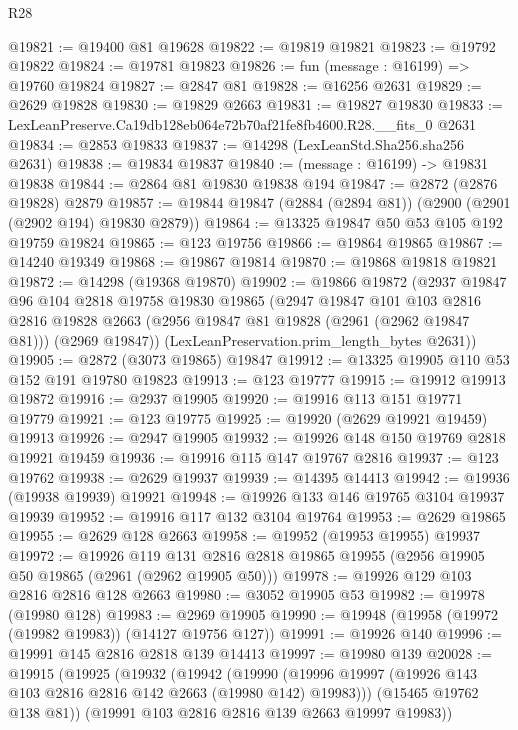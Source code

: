 \begin{lexlean}{R28}
\begin{coremodule}
@19821 := @19400 @81 @19628
@19822 := @19819 @19821
@19823 := @19792 @19822
@19824 := @19781 @19823
@19826 := fun (message : @16199) => @19760 @19824
@19827 := @2847 @81
@19828 := @16256 @2631
@19829 := @2629 @19828
@19830 := @19829 @2663
@19831 := @19827 @19830
@19833 := LexLeanPreserve.Ca19db128eb064e72b70af21fe8fb4600.R28.__fits_0 @2631
@19834 := @2853 @19833
@19837 := @14298 (LexLeanStd.Sha256.sha256 @2631)
@19838 := @19834 @19837
@19840 := (message : @16199) -> @19831 @19838
@19844 := @2864 @81 @19830 @19838 @194
@19847 := @2872 (@2876 @19828) @2879
@19857 := @19844 @19847 (@2884 (@2894 @81)) (@2900 (@2901 (@2902 @194) @19830 @2879))
@19864 := @13325 @19847 @50 @53 @105 @192 @19759 @19824
@19865 := @123 @19756
@19866 := @19864 @19865
@19867 := @14240 @19349
@19868 := @19867 @19814
@19870 := @19868 @19818 @19821
@19872 := @14298 (@19368 @19870)
@19902 := @19866
    @19872
    (@2937
      @19847
      @96
      @104
      @2818
      @19758
      @19830
      @19865
      (@2947
        @19847
        @101
        @103
        @2816
        @2816
        @19828
        @2663
        (@2956 @19847 @81 @19828 (@2961 (@2962 @19847 @81)))
        (@2969 @19847))
      (LexLeanPreservation.prim_length_bytes @2631))
@19905 := @2872 (@3073 @19865) @19847
@19912 := @13325 @19905 @110 @53 @152 @191 @19780 @19823
@19913 := @123 @19777
@19915 := @19912 @19913 @19872
@19916 := @2937 @19905
@19920 := @19916 @113 @151 @19771 @19779
@19921 := @123 @19775
@19925 := @19920 (@2629 @19921 @19459) @19913
@19926 := @2947 @19905
@19932 := @19926 @148 @150 @19769 @2818 @19921 @19459
@19936 := @19916 @115 @147 @19767 @2816
@19937 := @123 @19762
@19938 := @2629 @19937
@19939 := @14395 @14413
@19942 := @19936 (@19938 @19939) @19921
@19948 := @19926 @133 @146 @19765 @3104 @19937 @19939
@19952 := @19916 @117 @132 @3104 @19764
@19953 := @2629 @19865
@19955 := @2629 @128 @2663
@19958 := @19952 (@19953 @19955) @19937
@19972 := @19926
    @119
    @131
    @2816
    @2818
    @19865
    @19955
    (@2956 @19905 @50 @19865 (@2961 (@2962 @19905 @50)))
@19978 := @19926 @129 @103 @2816 @2816 @128 @2663
@19980 := @3052 @19905 @53
@19982 := @19978 (@19980 @128)
@19983 := @2969 @19905
@19990 := @19948 (@19958 (@19972 (@19982 @19983)) (@14127 @19756 @127))
@19991 := @19926 @140
@19996 := @19991 @145 @2816 @2818 @139 @14413
@19997 := @19980 @139
@20028 := @19915
    (@19925
      (@19932
        (@19942
          (@19990 (@19996 @19997 (@19926 @143 @103 @2816 @2816 @142 @2663 (@19980 @142) @19983)))
          (@15465 @19762 @138 @81))
        (@19991 @103 @2816 @2816 @139 @2663 @19997 @19983))

\end{coremodule}
\end{lexlean}
